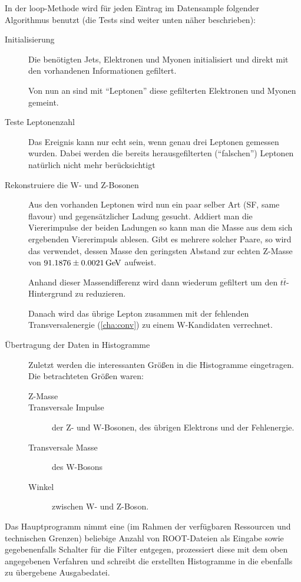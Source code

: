 In der loop-Methode wird für jeden Eintrag im Datensample folgender Algorithmus
benutzt (die Tests sind weiter unten näher beschrieben):
\begin{description}
  \item[Initialisierung] Die benötigten Jets, Elektronen und Myonen
    initialisiert und direkt mit den vorhandenen Informationen gefiltert.

    Von nun an sind mit "`Leptonen"' diese gefilterten Elektronen und Myonen
    gemeint.

  \item[Teste Leptonenzahl] Das Ereignis kann nur echt sein, wenn genau drei
    Leptonen gemessen wurden. Dabei werden die bereits herausgefilterten
    ("`falschen"') Leptonen natürlich nicht mehr berücksichtigt
    
  \item[Rekonstruiere die W- und Z-Bosonen] Aus den vorhanden Leptonen wird nun
    ein paar selber Art (SF, same flavour) und gegensätzlicher Ladung gesucht.
    Addiert man die Viererimpulse der beiden Ladungen so kann man die Masse aus
    dem sich ergebenden Viererimpuls ablesen. Gibt es mehrere solcher Paare, so
    wird das verwendet, dessen Masse den geringsten Abstand zur echten Z-Masse
    von $\unit[91.1876 \pm 0.0021]{GeV}$\cite{pdg-booklet} aufweist.

    Anhand dieser Massendifferenz wird dann wiederum gefiltert um den
    $t\bar{t}$-Hintergrund zu reduzieren.

    Danach wird das übrige Lepton zusammen mit der fehlenden
    Transversalenergie (\ref{cha:conv}) zu einem W-Kandidaten verrechnet.

  \item[Übertragung der Daten in Histogramme] Zuletzt werden die interessanten
    Größen in die Histogramme eingetragen. Die betrachteten Größen waren:
    \begin{description}
      \item[Z-Masse]
      \item[Transversale Impulse] der Z- und W-Bosonen, des übrigen Elektrons
        und der Fehlenergie.
      \item[Transversale Masse] des W-Bosons
      \item[Winkel] zwischen W- und Z-Boson.
    \end{description}
\end{description}

Das Hauptprogramm nimmt eine (im Rahmen der verfügbaren Ressourcen und
technischen Grenzen) beliebige Anzahl von ROOT-Dateien als Eingabe sowie
gegebenenfalls Schalter für die Filter entgegen, prozessiert diese mit dem oben
angegebenen Verfahren und schreibt die erstellten Histogramme in die ebenfalls
zu übergebene Ausgabedatei.

